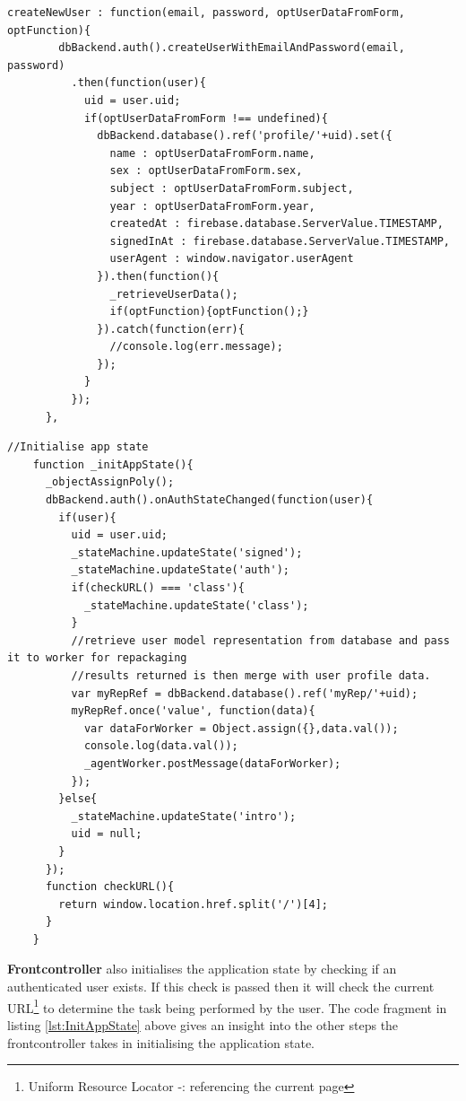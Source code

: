 \begin{lstlisting}[caption={creating a new user}, label={lst:CreateUSer}]
    createNewUser : function(email, password, optUserDataFromForm, optFunction){
        dbBackend.auth().createUserWithEmailAndPassword(email, password)
          .then(function(user){
            uid = user.uid;
            if(optUserDataFromForm !== undefined){
              dbBackend.database().ref('profile/'+uid).set({
                name : optUserDataFromForm.name,
                sex : optUserDataFromForm.sex,
                subject : optUserDataFromForm.subject,
                year : optUserDataFromForm.year,
                createdAt : firebase.database.ServerValue.TIMESTAMP,
                signedInAt : firebase.database.ServerValue.TIMESTAMP,
                userAgent : window.navigator.userAgent
              }).then(function(){
                _retrieveUserData();
                if(optFunction){optFunction();}
              }).catch(function(err){
                //console.log(err.message);
              });
            }
          });
      },
\end{lstlisting}


\begin{lstlisting}[caption={Initiating the application state from the front controller}, label={lst:InitAppState}]
    //Initialise app state
    function _initAppState(){
      _objectAssignPoly();
      dbBackend.auth().onAuthStateChanged(function(user){
        if(user){
          uid = user.uid;
          _stateMachine.updateState('signed');
          _stateMachine.updateState('auth');
          if(checkURL() === 'class'){
            _stateMachine.updateState('class');
          }
          //retrieve user model representation from database and pass it to worker for repackaging
          //results returned is then merge with user profile data.
          var myRepRef = dbBackend.database().ref('myRep/'+uid);
          myRepRef.once('value', function(data){
            var dataForWorker = Object.assign({},data.val());
            console.log(data.val());
            _agentWorker.postMessage(dataForWorker);
          });
        }else{
          _stateMachine.updateState('intro');
          uid = null;
        }
      });
      function checkURL(){
        return window.location.href.split('/')[4];
      }
    }
\end{lstlisting}

\textbf{Frontcontroller} also initialises the application state by checking if an authenticated user exists. If this check is passed then it will check the current URL\footnote{Uniform Resource Locator -: referencing the current page} to determine the task being performed by the user. The code fragment in listing \ref{lst:InitAppState} above gives an insight into the other steps the frontcontroller takes in initialising the application state.


